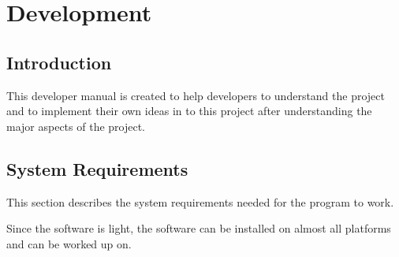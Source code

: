 \section{Development}


\subsection{Introduction}

This developer manual is created to help developers to understand the project and to implement their own ideas in to this project after understanding the major aspects of the project.

\subsection{System Requirements}


This section describes the system requirements needed for the program to work. 

Since the software is light, the software can be installed on almost all platforms and can be worked up on. 

